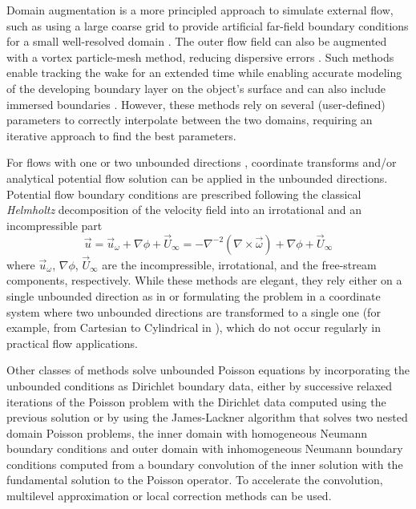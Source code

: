 \documentclass[final,1p,times]{elsarticle}
\begin{document}
Domain augmentation is a more principled approach to simulate external flow, such as using a large coarse grid to provide artificial far-field boundary conditions for a small well-resolved domain \cite{Colonius2008}. The outer flow field can also be augmented with a vortex particle-mesh method, reducing dispersive errors \cite{Billuart2023AFlows}. Such methods enable tracking the wake for an extended time while enabling accurate modeling of the developing boundary layer on the object's surface and can also include immersed boundaries \cite{Marichal2015UnboundedMethods}. However, these methods rely on several (user-defined) parameters to correctly interpolate between the two domains, requiring an iterative approach to find the best parameters.

For flows with one \cite{Grosch1977NumericalTransforms} or two unbounded directions \cite{Rennich1997NumericalDirections, Levy2022SolvingMethod}, coordinate transforms and/or analytical potential flow solution \cite{Tsynkov1998NumericalReview} can be applied in the unbounded directions. Potential flow boundary conditions are prescribed following the classical \emph{Helmholtz} decomposition of the velocity field into an irrotational and an incompressible part
\begin{equation}\label{eq:u_vort}
    \vec{u} = \vec{u}_\omega + \nabla\phi + \vec{U}_\infty = -\nabla^{-2}\left(\nabla \times \vec{\omega}\right) + \nabla\phi + \vec{U}_\infty
\end{equation}
where $\vec{u}_\omega$, $\nabla\phi$, $\vec{U}_\infty$ are the incompressible, irrotational, and the free-stream components, respectively. While these methods are elegant, they rely either on a single unbounded direction as in \cite{Grosch1977NumericalTransforms} or formulating the problem in a coordinate system where two unbounded directions are transformed to a single one (for example, from Cartesian to Cylindrical in \cite{Levy2022SolvingMethod}), which do not occur regularly in practical flow applications.

Other classes of methods solve unbounded Poisson equations by incorporating the unbounded conditions as Dirichlet boundary data, either by successive relaxed iterations of the Poisson problem with the Dirichlet data computed using the previous solution \cite{Miller2008AnBoundaries} or by using the James-Lackner \cite{Jamb1977TheDistributions, Lackner1976COMPUTATIONEQUILIBRIA} algorithm that solves two nested domain Poisson problems, the inner domain with homogeneous Neumann boundary conditions and outer domain with inhomogeneous Neumann boundary conditions computed from a boundary convolution of the inner solution with the fundamental solution to the Poisson operator. To accelerate the convolution, multilevel approximation \cite{Mccorquodale2006ADimensions} or local correction methods \cite{Kavouklis2019ComputationCorrections} can be used.
\end{document}
